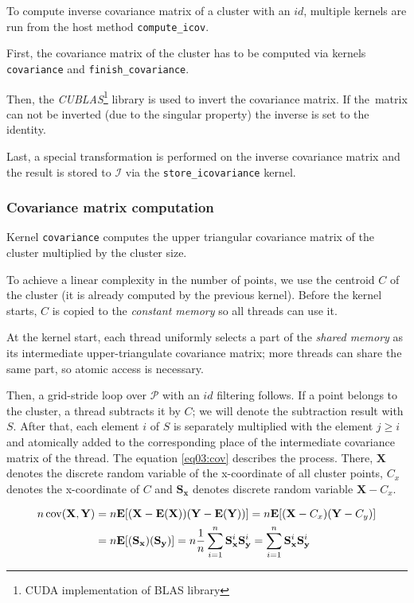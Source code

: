 To compute inverse covariance matrix of a cluster with an $id$, multiple kernels are run from the host method \texttt{compute\_icov}. 

First, the covariance matrix of the cluster has to be computed via kernels \texttt{covariance} and \texttt{finish\_covariance}. 

Then, the \emph{CUBLAS}\footnote{CUDA implementation of BLAS library} library is used to invert the covariance matrix. If the~matrix can not be inverted (due to the singular property) the inverse is set to the identity. 

Last, a special transformation is performed on the inverse covariance matrix and the result is stored to $\mathcal{I}$ via the \texttt{store\_icovariance} kernel.

\subsubsection{Covariance matrix computation}

Kernel \texttt{covariance} computes the upper triangular covariance matrix of the cluster multiplied by the cluster size. 

To achieve a linear complexity in the number of points, we use the centroid $C$ of the cluster (it is already computed by the previous kernel). Before the kernel starts, $C$ is copied to the \emph{constant memory} so all threads can use it.

At the kernel start, each thread uniformly selects a part of the \emph{shared memory} as its intermediate upper-triangulate covariance matrix; more threads can share the same part, so atomic access is necessary.

Then, a grid-stride loop over $\mathcal{P}$ with an $id$ filtering follows. If a point belongs to the cluster, a thread subtracts it by $C$; we will denote the subtraction result with $S$. After that, each element $i$ of $S$ is separately multiplied with the element $j \ge i$ and atomically added to the corresponding place of the intermediate covariance matrix of the thread. The equation \ref{eq03:cov} describes the process. There, $\textbf{X}$ denotes the discrete random variable of the x-coordinate of all cluster points, $C_x$ denotes the x-coordinate of $C$ and $\mathbf{S_x}$ denotes discrete random variable $\mathbf{X}-C_x$.

\begin{equation}
\begin{split}
n\operatorname{cov}(\mathbf{X},\mathbf{Y}) &= n\mathbf{E}[(\mathbf{X}-\mathbf{E}(\mathbf{X}))(\mathbf{Y}-\mathbf{E}(\mathbf{Y}))] = n\mathbf{E}[(\mathbf{X}-C_x)(\mathbf{Y}-C_y)] \\ &= n\mathbf{E}[(\mathbf{S_x})(\mathbf{S_y})] = n\frac{1}{n}\sum_{i=1}^{n}{\mathbf{S}_{\mathbf{x}}^{i}\mathbf{S}_{\mathbf{y}}^{i}} = \sum_{i=1}^{n}{\mathbf{S}_{\mathbf{x}}^{i}\mathbf{S}_{\mathbf{y}}^{i}}
\end{split}
\label{eq03:cov}
\end{equation}

